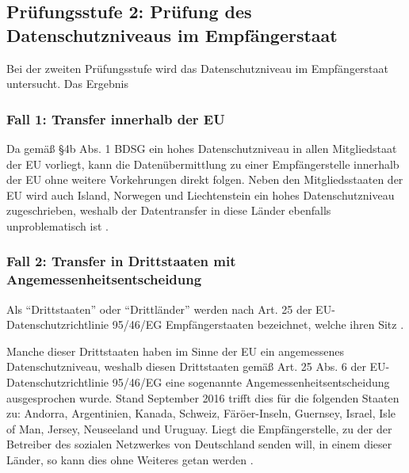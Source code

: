\subsection{Prüfungsstufe 2: Prüfung des Datenschutzniveaus im Empfängerstaat}
Bei der zweiten Prüfungsstufe wird das Datenschutzniveau im Empfängerstaat untersucht. Das Ergebnis

\subsubsection{Fall 1: Transfer innerhalb der EU}
Da gemäß §4b Abs. 1 BDSG ein hohes Datenschutzniveau in allen Mitgliedstaat der \acl{EU} vorliegt, kann die Datenübermittlung zu einer Empfängerstelle innerhalb der \acl{EU} ohne weitere Vorkehrungen direkt folgen. Neben den Mitgliedsstaaten der \ac{EU} wird auch Island, Norwegen und Liechtenstein ein hohes Datenschutzniveau zugeschrieben, weshalb der Datentransfer in diese Länder ebenfalls unproblematisch ist \autocite[vgl.][]{LDI.2017}.

\subsubsection{Fall 2: Transfer in Drittstaaten mit Angemessenheitsentscheidung}
Als "`Drittstaaten"' oder "`Drittländer"' werden nach Art. 25 der EU-Datenschutzrichtlinie 95/46/EG Empfängerstaaten bezeichnet, welche ihren Sitz \autocite[vgl.][]{LDI.2017} \autocite[vgl.][]{EG.1995}.
\par
Manche dieser Drittstaaten haben im Sinne der \ac{EU} ein angemessenes Datenschutzniveau, weshalb diesen Drittstaaten gemäß Art. 25 Abs. 6 der EU-Datenschutzrichtlinie 95/46/EG eine sogenannte Angemessenheitsentscheidung ausgesprochen wurde. Stand September 2016 trifft dies für die folgenden Staaten zu: Andorra, Argentinien, Kanada, Schweiz, Färöer-Inseln, Guernsey, Israel, Isle of Man, Jersey, Neuseeland und Uruguay. Liegt die Empfängerstelle, zu der der Betreiber des sozialen Netzwerkes von Deutschland senden will, in einem dieser Länder, so kann dies ohne Weiteres getan werden \autocite[vgl.][]{LDI.2017} \autocite[vgl.][]{EG.1995}.

